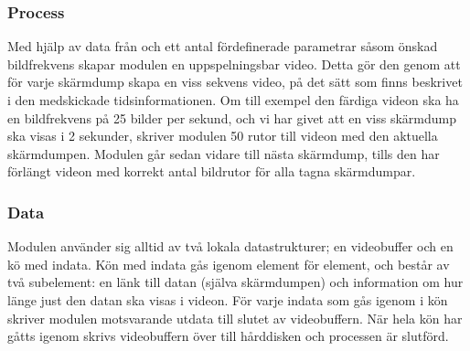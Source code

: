 \subsubsection{Process}
Med hjälp av data från  och ett antal fördefinerade parametrar såsom önskad bildfrekvens skapar modulen en uppspelningsbar video. Detta gör den genom att för varje skärmdump skapa en viss sekvens video, på det sätt som finns beskrivet i den medskickade tidsinformationen. Om till exempel den färdiga videon ska ha en bildfrekvens på 25 bilder per sekund, och vi har givet att en viss skärmdump ska visas i 2 sekunder, skriver modulen 50 rutor till videon med den aktuella skärmdumpen. Modulen går sedan vidare till nästa skärmdump, tills den har förlängt videon med korrekt antal bildrutor för alla tagna skärmdumpar.

\subsubsection{Data}
Modulen använder sig alltid av två lokala datastrukturer; en videobuffer och en kö med indata. Kön med indata gås igenom element för element, och består av två subelement: en länk till datan (själva skärmdumpen) och information om hur länge just den datan ska visas i videon. För varje indata som gås igenom i kön skriver modulen motsvarande utdata till slutet av videobuffern. När hela kön har gåtts igenom skrivs videobuffern över till hårddisken och processen är slutförd.
